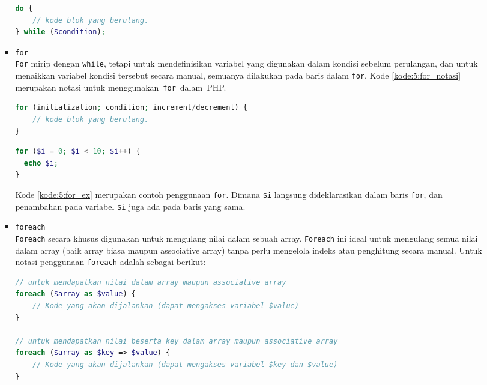 \documentclass[a4paper,twoside]{article}
\begin{document}
\begin{enumerate}
\begin{itemize}
\begin{itemize}
			                  \begin{lstlisting}[language={php}, caption={Notasi do-while}, label={kode:5:do-while_notasi}]
do {
	// kode blok yang berulang.
} while ($condition);
								\end{lstlisting}

			            \item \verb|for| \\
			                  \verb|For| mirip dengan \verb|while|, tetapi untuk mendefinisikan variabel yang digunakan dalam kondisi sebelum perulangan, dan untuk menaikkan variabel kondisi tersebut secara manual, semuanya dilakukan pada baris dalam \verb|for|. Kode \ref{kode:5:for_notasi} merupakan notasi untuk menggunakan~\verb|for|~dalam~PHP.

			                  \begin{lstlisting}[language={php}, caption={Notasi for}, label={kode:5:for_notasi}]
for (initialization; condition; increment/decrement) {
	// kode blok yang berulang.
}
								\end{lstlisting}

			                  \begin{lstlisting}[language={php}, caption={Contoh Penggunaan for}, label={kode:5:for_ex}]
for ($i = 0; $i < 10; $i++) {
  echo $i;
}
								\end{lstlisting}

			                  Kode \ref{kode:5:for_ex} merupakan contoh penggunaan \verb|for|. Dimana \verb|$i| langsung dideklarasikan dalam baris \verb|for|, dan penambahan pada variabel \verb|$i| juga ada pada baris yang sama.

			            \item \verb|foreach| \\
			                  \verb|Foreach| secara khusus digunakan untuk mengulang nilai dalam sebuah array. \verb|Foreach| ini ideal untuk mengulang semua nilai dalam array (baik array biasa maupun associative array) tanpa perlu mengelola indeks atau penghitung secara manual. Untuk notasi penggunaan \verb|foreach| adalah sebagai berikut:

			                  \begin{lstlisting}[language={php}, caption={Notasi foreach}, label={kode:5:foreach_notasi}]
// untuk mendapatkan nilai dalam array maupun associative array
foreach ($array as $value) {
	// Kode yang akan dijalankan (dapat mengakses variabel $value)
}

// untuk mendapatkan nilai beserta key dalam array maupun associative array
foreach ($array as $key => $value) {
    // Kode yang akan dijalankan (dapat mengakses variabel $key dan $value)
}
						\end{lstlisting}


\end{itemize}
\end{itemize}
\end{enumerate}
\end{document}
